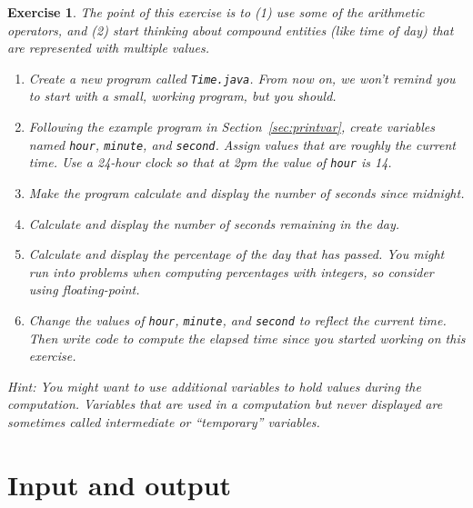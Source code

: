 \documentclass[12pt]{book}
\theoremstyle{exercise}
\newtheorem{exercise}{Exercise}[chapter]
\newcommand{\java}[1]{\verb"#1"}
\begin{document}
\begin{exercise}

The point of this exercise is to (1) use some of the arithmetic operators, and (2) start thinking about compound entities (like time of day) that are represented with multiple values.

\begin{enumerate}

\item Create a new program called {\tt Time.java}.
From now on, we won't remind you to start with a small, working program, but you should.

\item Following the example program in Section~\ref{sec:printvar}, create variables named \java{hour}, \java{minute}, and \java{second}.
Assign values that are roughly the current time.
Use a 24-hour clock so that at 2pm the value of \java{hour} is 14.

\item Make the program calculate and display the number of seconds since midnight.

\item Calculate and display the number of seconds remaining in the day.

\item Calculate and display the percentage of the day that has passed.
You might run into problems when computing percentages with integers, so consider using floating-point.

\item Change the values of \java{hour}, \java{minute}, and \java{second} to reflect the current time.
Then write code to compute the elapsed time since you started working on this exercise.

\end{enumerate}

Hint: You might want to use additional variables to hold values during the computation.
Variables that are used in a computation but never displayed are sometimes called intermediate or ``temporary'' variables.

\end{exercise}


\chapter{Input and output}

\end{document}

